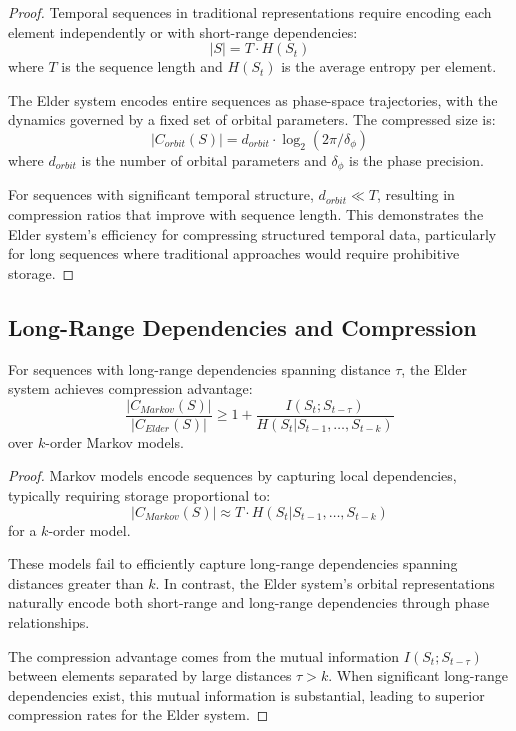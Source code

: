 \begin{proof}
Temporal sequences in traditional representations require encoding each element independently or with short-range dependencies:
\begin{equation}
|S| = T \cdot H(S_t)
\end{equation}
where $T$ is the sequence length and $H(S_t)$ is the average entropy per element.

The Elder system encodes entire sequences as phase-space trajectories, with the dynamics governed by a fixed set of orbital parameters. The compressed size is:
\begin{equation}
|C_{orbit}(S)| = d_{orbit} \cdot \log_2(2\pi/\delta_{\phi})
\end{equation}
where $d_{orbit}$ is the number of orbital parameters and $\delta_{\phi}$ is the phase precision.

For sequences with significant temporal structure, $d_{orbit} \ll T$, resulting in compression ratios that improve with sequence length. This demonstrates the Elder system's efficiency for compressing structured temporal data, particularly for long sequences where traditional approaches would require prohibitive storage.
\end{proof}

\subsection{Long-Range Dependencies and Compression}

\begin{theorem}
For sequences with long-range dependencies spanning distance $\tau$, the Elder system achieves compression advantage:
\begin{equation}
\frac{|C_{Markov}(S)|}{|C_{Elder}(S)|} \geq 1 + \frac{I(S_t; S_{t-\tau})}{H(S_t | S_{t-1}, \ldots, S_{t-k})}
\end{equation}
over $k$-order Markov models.
\end{theorem}

\begin{proof}
Markov models encode sequences by capturing local dependencies, typically requiring storage proportional to:
\begin{equation}
|C_{Markov}(S)| \approx T \cdot H(S_t | S_{t-1}, \ldots, S_{t-k})
\end{equation}
for a $k$-order model.

These models fail to efficiently capture long-range dependencies spanning distances greater than $k$. In contrast, the Elder system's orbital representations naturally encode both short-range and long-range dependencies through phase relationships.

The compression advantage comes from the mutual information $I(S_t; S_{t-\tau})$ between elements separated by large distances $\tau > k$. When significant long-range dependencies exist, this mutual information is substantial, leading to superior compression rates for the Elder system.
\end{proof}

